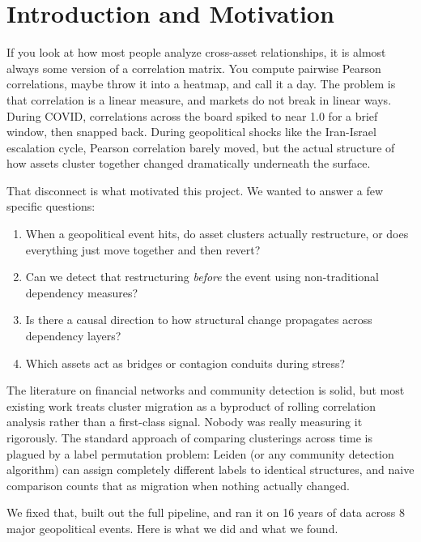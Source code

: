 \documentclass[12pt, letterpaper]{article}
\begin{document}
\newpage
\tableofcontents
\newpage

\section{Introduction and Motivation}

If you look at how most people analyze cross-asset relationships, it is almost always some version of a correlation matrix. You compute pairwise Pearson correlations, maybe throw it into a heatmap, and call it a day. The problem is that correlation is a linear measure, and markets do not break in linear ways. During COVID, correlations across the board spiked to near 1.0 for a brief window, then snapped back. During geopolitical shocks like the Iran-Israel escalation cycle, Pearson correlation barely moved, but the actual structure of how assets cluster together changed dramatically underneath the surface.

That disconnect is what motivated this project. We wanted to answer a few specific questions:

\begin{enumerate}[label=\arabic*.]
    \item When a geopolitical event hits, do asset clusters actually restructure, or does everything just move together and then revert?
    \item Can we detect that restructuring \textit{before} the event using non-traditional dependency measures?
    \item Is there a causal direction to how structural change propagates across dependency layers?
    \item Which assets act as bridges or contagion conduits during stress?
\end{enumerate}

The literature on financial networks and community detection is solid, but most existing work treats cluster migration as a byproduct of rolling correlation analysis rather than a first-class signal. Nobody was really measuring it rigorously. The standard approach of comparing clusterings across time is plagued by a label permutation problem: Leiden (or any community detection algorithm) can assign completely different labels to identical structures, and naive comparison counts that as migration when nothing actually changed.

We fixed that, built out the full pipeline, and ran it on 16 years of data across 8 major geopolitical events. Here is what we did and what we found.
\end{document}
